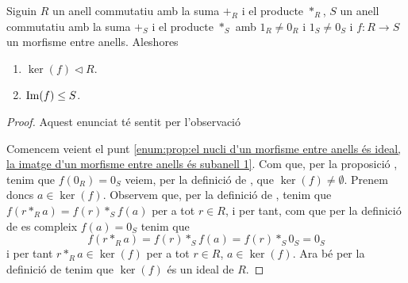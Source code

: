 \documentclass[../Apunts.tex]{subfiles}
\begin{document}
	\begin{proposition}
		\label{prop:el nucli d'un morfisme entre anells és ideal, la imatge d'un morfisme entre anells és subanell}
			Siguin \(R\) un anell commutatiu amb la suma \(+_{R}\) i el producte \(\ast_{R}\), \(S\) un anell commutatiu amb la suma \(+_{S}\) i el producte \(\ast_{S}\) amb \(1_{R}\neq0_{R}\) i \(1_{S}\neq0_{S}\) i \(f\colon R\longrightarrow S\) un morfisme entre anells. Aleshores
		\begin{enumerate}
			\item\label{enum:prop:el nucli d'un morfisme entre anells és ideal, la imatge d'un morfisme entre anells és subanell 1} \(\ker(f)\triangleleft R\).
			\item\label{enum:prop:el nucli d'un morfisme entre anells és ideal, la imatge d'un morfisme entre anells és subanell 2} \(\operatorname*{Im}(f)\leq S\).
		\end{enumerate}
		\begin{proof}
			Aquest enunciat té sentit per l'observació 
			
			Comencem veient el punt \eqref{enum:prop:el nucli d'un morfisme entre anells és ideal, la imatge d'un morfisme entre anells és subanell 1}. Com que, per la proposició , tenim que \(f(0_{R})=0_{S}\) veiem, per la definició de , que \(\ker(f)\neq\emptyset\). Prenem doncs \(a\in\ker(f)\). Observem que, per la definició de , tenim que \(f(r\ast_{R}a)=f(r)\ast_{S}f(a)\) per a tot \(r\in R\), i per tant, com que per la definició de  es compleix \(f(a)=0_{S}\) tenim que \[f(r\ast_{R}a)=f(r)\ast_{S}f(a)=f(r)\ast_{S}0_{S}=0_{S}\]
			i per tant \(r\ast_{R}a\in\ker(f)\) per a tot \(r\in R\), \(a\in\ker(f)\). Ara bé per la definició de  tenim que \(\ker(f)\) és un ideal de \(R\).
			

\end{proof}
\end{proposition}
\end{document}
